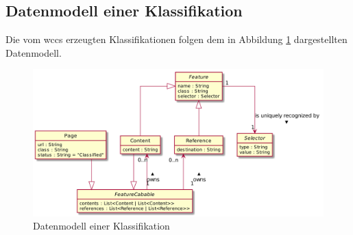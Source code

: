 
    \subsection{Datenmodell einer Klassifikation}
        \label{section:conceptPageDataModel}
        Die vom \gls{wccs} erzeugten Klassifikationen folgen dem
        in Abbildung \ref{image:conceptPageDataModel} dargestellten Datenmodell.

        \begin{figure}[htb]
            \centering
            \includegraphics[scale=\imageScalingFactor]{../resources/concept/page.png}
            \caption{Datenmodell einer Klassifikation}
            \label{image:conceptPageDataModel}
        \end{figure}

